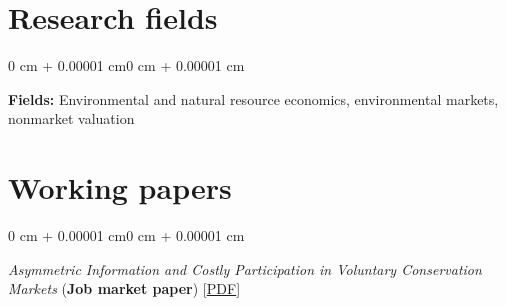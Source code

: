 \documentclass[12pt]{article}
\newenvironment{onecolentry}{
	\begin{adjustwidth}{0 cm + 0.00001 cm}{0 cm + 0.00001 cm}
	}
	{
	\end{adjustwidth}
}
\newenvironment{paper}{
	\begin{onecolentry}
	\begin{hangingpar}
}{
	\end{hangingpar}
	\end{onecolentry}
	\smallskip
}
\begin{document}
\section{Research fields}

\begin{onecolentry}
    \begin{hangingpar}
        \textbf{Fields:} Environmental and natural resource economics, environmental markets, nonmarket valuation
    \end{hangingpar}
\end{onecolentry}

\section{Working papers}

\begin{paper}
    \emph{Asymmetric Information and Costly Participation in Voluntary Conservation Markets} (\textbf{Job market paper}) \hfill [\href{https://wmrobin.github.io/research/papers/robinson-jmp.pdf}{PDF}]
\end{paper}
\end{document}
